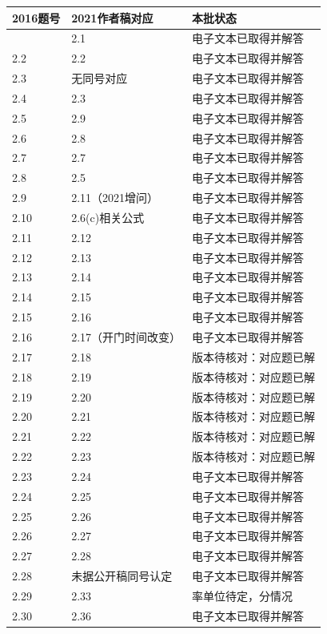 \documentclass[
  11pt,
  a4paper,
  UTF8,fontset=fandol]{ctexart}
\begin{document}
\begin{longtable}[]{@{}lll@{}}
\toprule\noalign{}
2016题号 & 2021作者稿对应 & 本批状态 \\
\midrule\noalign{}
\endhead
\bottomrule\noalign{}
\endlastfoot
2.1 & 2.1 & 电子文本已取得并解答 \\
2.2 & 2.2 & 电子文本已取得并解答 \\
2.3 & 无同号对应 & 电子文本已取得并解答 \\
2.4 & 2.3 & 电子文本已取得并解答 \\
2.5 & 2.9 & 电子文本已取得并解答 \\
2.6 & 2.8 & 电子文本已取得并解答 \\
2.7 & 2.7 & 电子文本已取得并解答 \\
2.8 & 2.5 & 电子文本已取得并解答 \\
2.9 & 2.11（2021增问） & 电子文本已取得并解答 \\
2.10 & 2.6(c)相关公式 & 电子文本已取得并解答 \\
2.11 & 2.12 & 电子文本已取得并解答 \\
2.12 & 2.13 & 电子文本已取得并解答 \\
2.13 & 2.14 & 电子文本已取得并解答 \\
2.14 & 2.15 & 电子文本已取得并解答 \\
2.15 & 2.16 & 电子文本已取得并解答 \\
2.16 & 2.17（开门时间改变） & 电子文本已取得并解答 \\
2.17 & 2.18 & 版本待核对：对应题已解 \\
2.18 & 2.19 & 版本待核对：对应题已解 \\
2.19 & 2.20 & 版本待核对：对应题已解 \\
2.20 & 2.21 & 版本待核对：对应题已解 \\
2.21 & 2.22 & 版本待核对：对应题已解 \\
2.22 & 2.23 & 版本待核对：对应题已解 \\
2.23 & 2.24 & 电子文本已取得并解答 \\
2.24 & 2.25 & 电子文本已取得并解答 \\
2.25 & 2.26 & 电子文本已取得并解答 \\
2.26 & 2.27 & 电子文本已取得并解答 \\
2.27 & 2.28 & 电子文本已取得并解答 \\
2.28 & 未据公开稿同号认定 & 电子文本已取得并解答 \\
2.29 & 2.33 & 率单位待定，分情况 \\
2.30 & 2.36 & 电子文本已取得并解答 \\

\end{longtable}
\end{document}
